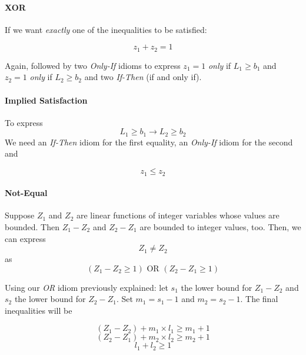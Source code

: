 \paragraph{XOR \\}
If we want \textit{exactly} one of the inequalities to be satisfied:

$$z_1 + z_2 = 1$$

Again, followed by two \textit{Only-If} idioms to express $z_1 = 1$ \textit{only} if $L_1 \geq b_1$ and $z_2 = 1$ \textit{only} if $L_2 \geq b_2$ and two \textit{If-Then} (if and only if).

\paragraph{Implied Satisfaction \\}
To express
$$ L_1 \geq b_1 \rightarrow L_2 \geq b_2$$
We need an \textit{If-Then} idiom for the first equality, an \textit{Only-If} idiom for the second and

$$z_1 \leq z_2$$

\paragraph{Not-Equal \\}

Suppose $Z_1$ and $Z_2$ are linear functions of integer variables whose values are bounded. Then $Z_1 - Z_2$ and $Z_2 - Z_1$ are bounded to integer values, too. Then, we can express
$$Z_1 \neq Z_2$$
as
$$(Z_1 - Z_2 \geq 1) \text{ OR } (Z_2 - Z_1 \geq 1) $$

Using our \textit{OR} idiom previously explained: let $s_1$ the lower bound for $Z_1 - Z_2$ and $s_2$ the lower bound for $Z_2 - Z_1$.
Set  $m_1 = s_1 - 1$ and $m_2 = s_2 - 1$. The final inequalities will be

$$(Z_1 - Z_2) + m_1 \times l_1 \geq m_1 + 1$$
$$(Z_2 - Z_1) + m_2 \times l_2 \geq m_2 + 1$$
$$ l_1 + l_2 \geq 1 $$

